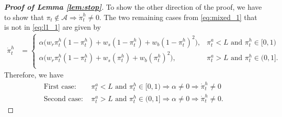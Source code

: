 \documentclass[letterpaper]{article} %
\begin{document}
\begin{proof}[\textbf{Proof of Lemma \ref{lem:stop}}]
To show the other direction of the proof, we have to show that $\pi_t \notin \mathcal{A} \Rightarrow \dot{\pi}^h_t \neq 0$. The two remaining cases from \eqref{eq:mixed_1} that is not in \eqref{eq:l1_1} are given by
\begin{align}
     \dot{\pi}^h_t &=
	\begin{cases}
	       \alpha \bigg(w_r \pi^h_t(1-\pi^h_t) + w_s (1-\pi^h_t) + w_b (1-\pi_t^h)^2  \bigg) ,& \pi^a_t < L \text{ and } \pi_t^h \in [0,1) \\
	       \alpha \bigg(w_r \pi^h_t(1-\pi^h_t) + w_s (\pi^h_t) + w_b (\pi^h_t)^2  \bigg) ,&  \pi^a_t > L \text{ and } \pi_t^h \in (0,1].  \\
	\end{cases} \label{eq:other_direction1}
\end{align}
Therefore, we have
\begin{align}
    \textrm{First case: } &\pi^a_t < L \textrm{ and } \pi_t^h \in [0,1) \Rightarrow \alpha \neq 0 \Rightarrow \dot{\pi}^h_t \neq 0 \label{eq:other_direction2}\\
    \textrm{Second case: } &\pi^a_t > L \textrm{ and } \pi_t^h \in (0,1] \Rightarrow \alpha \neq 0 \Rightarrow \dot{\pi}^h_t \neq 0. \label{eq:other_direction3}
\end{align}



\end{proof}
\end{document}
